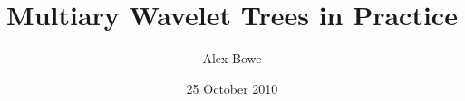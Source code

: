\documentclass[a4paper]{article}
\begin{document}
\title{Multiary Wavelet Trees in Practice}
\author{Alex Bowe}
\date{25 October 2010}


\maketitle

\begin{abstract}

\end{abstract}

% 





%









\end{document}
